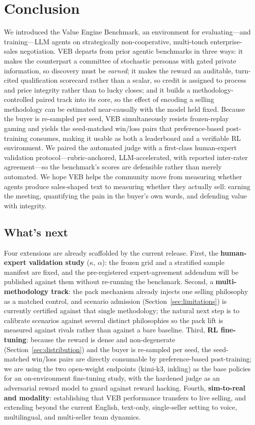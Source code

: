 \section{Conclusion}
\label{sec:conclusion}

We introduced the Value Engine Benchmark, an environment for evaluating---and
training---LLM agents on strategically non-cooperative, multi-touch enterprise-sales
negotiation. VEB departs from prior agentic benchmarks in three ways: it makes the
counterpart a committee of stochastic personas with gated private information, so
discovery must be \emph{earned}; it makes the reward an auditable, turn-cited
qualification scorecard rather than a scalar, so credit is assigned to process and
price integrity rather than to lucky closes; and it builds a methodology-controlled
paired track into its core, so the effect of encoding a selling methodology can be
estimated near-causally with the model held fixed. Because the buyer is re-sampled
per seed, VEB simultaneously resists frozen-replay gaming and yields the
seed-matched win/loss pairs that preference-based post-training consumes, making it
usable as both a leaderboard and a verifiable RL environment. We paired the
automated judge with a first-class human-expert validation protocol---rubric-anchored,
LLM-accelerated, with reported inter-rater agreement---so the benchmark's scores
are defensible rather than merely automated. We hope VEB helps the community move
from measuring whether agents produce sales-shaped text to measuring whether they
actually sell: earning the meeting, quantifying the pain in the buyer's own words,
and defending value with integrity.

\subsection{What's next}
\label{sec:whatsnext}
Four extensions are already scaffolded by the current release. First, the
\textbf{human-expert validation study} ($\kappa$, $\alpha$): the frozen grid and a
stratified sample manifest are fixed, and the pre-registered expert-agreement
addendum will be published against them without re-running the benchmark. Second, a
\textbf{multi-methodology track}: the pack mechanism already injects one selling
philosophy as a matched control, and scenario admission (Section~\ref{sec:limitations})
is currently certified against that single methodology; the natural next step is to
calibrate scenarios against several distinct philosophies so the pack lift is
measured against rivals rather than against a bare baseline. Third,
\textbf{RL fine-tuning}: because the reward is dense and non-degenerate
(Section~\ref{sec:distribution}) and the buyer is re-sampled per seed, the
seed-matched win/loss pairs are directly consumable by preference-based
post-training; we are using the two open-weight endpoints (kimi-k3, inkling) as the
base policies for an on-environment fine-tuning study, with the hardened judge as an
adversarial reward model to guard against reward hacking. Fourth,
\textbf{sim-to-real and modality}: establishing that VEB performance transfers to
live selling, and extending beyond the current English, text-only, single-seller
setting to voice, multilingual, and multi-seller team dynamics.
